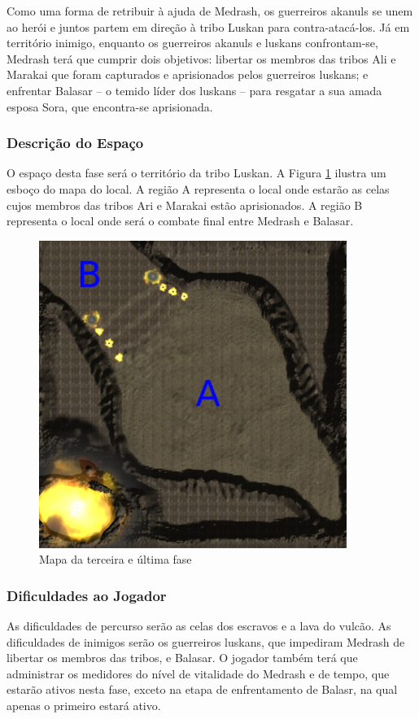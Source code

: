 Como uma forma de retribuir à ajuda de Medrash, os guerreiros akanuls se unem ao herói e juntos partem em direção à tribo Luskan para contra-atacá-los. Já em território inimigo, enquanto os guerreiros akanuls e luskans confrontam-se, Medrash terá que cumprir dois objetivos: libertar os membros das tribos Ali e Marakai que foram capturados e aprisionados pelos guerreiros luskans; e enfrentar Balasar -- o temido líder dos luskans -- para resgatar a sua amada esposa Sora, que encontra-se aprisionada.

\subsubsection{Descrição do Espaço}

O espaço desta fase será o território da tribo Luskan. A Figura \ref{fig:MapaDaFase3} ilustra um esboço do mapa do local. A região A representa o local onde estarão as celas cujos membros das tribos Ari e Marakai estão aprisionados. A região B representa o local onde será o combate final entre Medrash e Balasar.

\begin{figure}[h]
\centering
\includegraphics[width=10cm]{fases_mapa_3.jpg} 
\caption{Mapa da terceira e última fase}
\label{fig:MapaDaFase3}
\end{figure}

\subsubsection{Dificuldades ao Jogador}

As dificuldades de percurso serão as celas dos escravos e a lava do vulcão. As dificuldades de inimigos serão os guerreiros luskans, que impediram Medrash de libertar os membros das tribos, e Balasar. O jogador também terá que administrar os medidores do nível de vitalidade do Medrash e de tempo, que estarão ativos nesta fase, exceto na etapa de enfrentamento de Balasr, na qual apenas o primeiro estará ativo.


